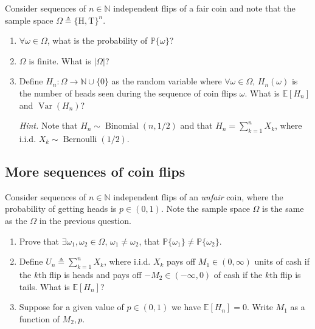 \documentclass{article}
\numberwithin{equation}{section}
\begin{document}
Consider sequences of $ n \in \mathbb{N} $ independent flips of a fair coin
and note that the sample space $ \Omega \triangleq \{\text{H}, \text{T}\}^n $.
\begin{enumerate}[label = \alph*.]
    \item
    $ \forall \omega \in \Omega $, what is the probability of
    $ \mathbb{P}\{\omega\} $?

    \item
    $ \Omega $ is finite. What is $ |\Omega| $?

    \item
    Define $ H_n : \Omega \rightarrow \mathbb{N} \cup \{0\} $ as the random
    variable where $ \forall \omega \in \Omega $, $ H_n(\omega) $ is the
    number of heads seen during the sequence of coin flips $ \omega $. What
    is $ \mathbb{E}[H_n] $ and $ \operatorname{Var}(H_n) $?

    \medskip
    
    \textit{Hint.} Note that $ H_n \sim \operatorname{Binomial}(n, 1 / 2) $
    and that $ H_n = \sum_{k = 1}^nX_k $, where i.i.d.
    $ X_k \sim \operatorname{Bernoulli}(1 / 2) $.
\end{enumerate}

\subsection{More sequences of coin flips}

Consider sequences of $ n \in \mathbb{N} $ independent flips of an
\textit{unfair} coin, where the probability of getting heads is
$ p \in (0, 1) $. Note the sample space $ \Omega $ is the same as the
$ \Omega $ in the previous question.
\begin{enumerate}[label = \alph*.]
    \item
    Prove that $ \exists \omega_1, \omega_2 \in \Omega $,
    $ \omega_1 \ne \omega_2 $, that $ \mathbb{P}\{\omega_1\} \ne
    \mathbb{P}\{\omega_2\} $.

    \item
    Define $ U_n \triangleq \sum_{k = 1}^nX_k $, where i.i.d.
    $ X_k $ pays off $ M_1 \in (0, \infty) $ units of cash if the $ k $th
    flip is heads and pays off $ -M_2 \in (-\infty, 0) $ of cash if the
    $ k $th flip is tails. What is $ \mathbb{E}[H_n] $?

    \item
    Suppose for a given value of $ p \in (0, 1) $ we have
    $ \mathbb{E}[H_n] = 0 $. Write $ M_1 $ as a function of $ M_2, p $.
\end{enumerate}
\end{document}

